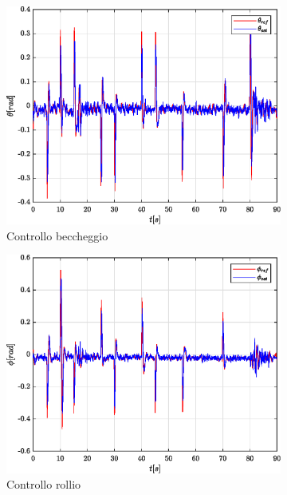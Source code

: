 \begin{figure}
	\centering
	\begin{subfigure}{0.45\textwidth}
		\centering
		\includegraphics[width=1\textwidth]{Simulazioni/Figure/SMC/SNAKE/AttitudeControlPitch}
		\caption{Controllo beccheggio}
	\end{subfigure}
	\hfill
	\begin{subfigure}{0.45\textwidth}
		\centering
		\includegraphics[width=1\textwidth]{Simulazioni/Figure/SMC/SNAKE/AttitudeControlRoll}
		\caption{Controllo rollio}
	\end{subfigure}
	\hfill
	\begin{subfigure}{0.45\textwidth}

\end{subfigure}
\end{figure}
